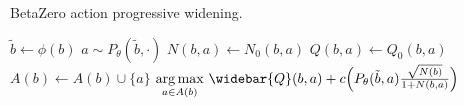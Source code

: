 \begin{algorithm}[H]
    \caption{BetaZero action progressive widening.}
    \label{alg:betazero-action-pw}
    \begin{algorithmic}[1]
            \State $\tilde{b} \leftarrow \phi(b)$ 
             
                \State $a \sim P_\theta(\tilde{b}, \cdot)$ \label{line:sample_action}
                \State $N(b,a) \leftarrow N_0(b,a)$
                \State $Q(b,a) \leftarrow Q_0(b,a)$ \label{line:init_q} 
                \State $A(b) \leftarrow A(b) \cup \{a\}$ 
            \EndIf
            \State \Return ${\displaystyle\argmax_{a \in A(b)}}\ \widebar{Q}(b,a) + c\Bigl(P_\theta(\tilde{b},a)\frac{\sqrt{N(b)}}{1 + N(b,a)}\Bigr)$ 
        \EndFunction
    \end{algorithmic}
\end{algorithm}
